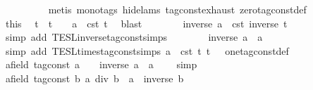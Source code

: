 \begin{isabellebody}
\ \ \ \ \ \ \ \ \isamarkupfalse%
\ {\isacharparenleft}metis\ {\isacharparenleft}mono{\isacharunderscore}tags{\isacharcomma}\ hide{\isacharunderscore}lams{\isacharparenright}\ tag{\isacharunderscore}const{\isachardot}exhaust\ zero{\isacharunderscore}tag{\isacharunderscore}const{\isacharunderscore}def{\isacharparenright}\isanewline
\ \ \ \ \ \ \isamarkupfalse%
\ this\ \isamarkupfalse%
\ t\ \ {\isacartoucheopen}t\ {\isasymnoteq}\ {}{\isacartoucheclose}\ \ {\isacartoucheopen}a\ {\isacharequal}\ {\isasymtau}\isactrlsub c\isactrlsub s\isactrlsub t\ t{\isacartoucheclose}\ \isamarkupfalse%
\ blast\isanewline
\ \ \ \ \ \ \isamarkupfalse%
\ {\isacartoucheopen}inverse\ a\ {\isacharequal}\ {\isasymtau}\isactrlsub c\isactrlsub s\isactrlsub t\ {\isacharparenleft}inverse\ t{\isacharparenright}{\isacartoucheclose}\isanewline
\ \ \ \ \ \ \ \ \isamarkupfalse%
\ {\isacharparenleft}simp\ add{\isacharcolon}\ TESL{\isachardot}inverse{\isacharunderscore}tag{\isacharunderscore}const{\isachardot}simps{\isacharparenright}\isanewline
\ \ \ \ \ \ \isamarkupfalse%
\ {\isacartoucheopen}inverse\ a\ {\isacharasterisk}\ a\ {\isacharequal}\ {}{\isacartoucheclose}\ \isamarkupfalse%
\isanewline
\ \ \ \ \ \ \ \ \isamarkupfalse%
\ {\isacharparenleft}simp\ add{\isacharcolon}\ TESL{\isachardot}times{\isacharunderscore}tag{\isacharunderscore}const{\isachardot}simps\ {\isacartoucheopen}a\ {\isacharequal}\ {\isasymtau}\isactrlsub c\isactrlsub s\isactrlsub t\ t{\isacartoucheclose}\ {\isacartoucheopen}t\ {\isasymnoteq}\ {}{\isacartoucheclose}\ one{\isacharunderscore}tag{\isacharunderscore}const{\isacharunderscore}def{\isacharparenright}\isanewline
\ \ \ \ \isacommand{{\isacharbraceright}}\isamarkupfalse%
\ \isamarkupfalse%
\ {\isacartoucheopen}{\isasymAnd}{\isacharparenleft}a{\isacharcolon}{\isacharcolon}{\isacharparenleft}{\isacharprime}{\isasymtau}{\isacharcolon}{\isacharcolon}field\ tag{\isacharunderscore}const{\isacharparenright}{\isacharparenright}{\isachardot}\ a\ {\isasymnoteq}\ {}\ {\isasymLongrightarrow}\ inverse\ a\ {\isacharasterisk}\ a\ {\isacharequal}\ {}{\isacartoucheclose}\ \isamarkupfalse%
\ simp\isanewline
\ \ \isamarkupfalse%
\isanewline
\ \ \isamarkupfalse%
\ {\isacartoucheopen}{\isasymAnd}{\isacharparenleft}a{\isacharcolon}{\isacharcolon}{\isacharparenleft}{\isacharprime}{\isasymtau}{\isacharcolon}{\isacharcolon}field\ tag{\isacharunderscore}const{\isacharparenright}{\isacharparenright}\ b{\isachardot}\ a\ div\ b\ {\isacharequal}\ a\ {\isacharasterisk}\ inverse\ b{\isacartoucheclose}\isanewline

\end{isabellebody}
